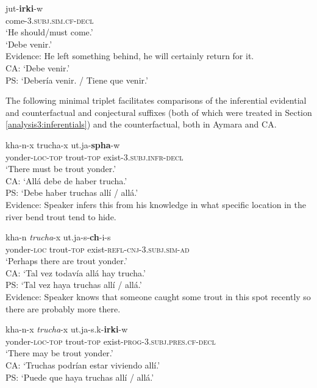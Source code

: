 \documentclass[output=paper,hidelinks]{langscibook}
\begin{document}
\ea
\gll jut-\textbf{irki}-w \\
come-3\textsc{.subj.sim.cf-decl} \\ \glt ‘He should/must come.’\\
‘Debe venir.’\\
Evidence: He left something behind, he will certainly return for it.\\
CA: `Debe venir.'\\
PS: `Debería venir. / Tiene que venir.'\\
\z

The following minimal triplet facilitates comparisons of the inferential evidential and counterfactual and conjectural suffixes (both of which were treated in Section \ref{analysis3:inferentials}) and the counterfactual, both in Aymara and CA.


\ea \label{ex:AymaraSPHA}
\gll kha-n-x trucha-x ut.ja-\textbf{spha}-w \\
yonder-\textsc{loc-top} trout-\textsc{top} exist-\textsc{3.subj.infr-decl} \\ \glt ‘There must be trout yonder.’ \citep[456]{coler2014grammar}\\
CA: `Allá debe de haber trucha.' \\
PS: `Debe haber truchas allí / allá.'\\
Evidence: Speaker infers this from his knowledge in what specific location in the river bend trout tend to hide.
\z

\ea
\gll kha-n \textit{trucha}-x ut.ja-s-\textbf{ch}-i-s \\
yonder-\textsc{loc} trout-\textsc{top} exist-\textsc{refl-cnj-3.subj.sim-ad} \\ 
\glt ‘Perhaps there are trout yonder.’ \citep[456]{coler2014grammar} \\
CA: `Tal vez todavía allá hay trucha.' \\
PS: `Tal vez haya truchas allí / allá.' \\
Evidence: Speaker knows that someone caught some trout in this spot recently so there are probably more there.\\
\z

\ea
\gll kha-n-x \textit{trucha}-x ut.ja-s.k-\textbf{irki}-w \\
yonder-\textsc{loc-top} trout-\textsc{top} exist-\textsc{prog-3.subj.pres.cf-decl} \\ \glt ‘There may be trout yonder.’ \citep[456]{coler2014grammar}\\
CA: ‘Truchas podrían estar viviendo allí.’\\
PS: `Puede que haya truchas allí / allá.'
\end{document}
